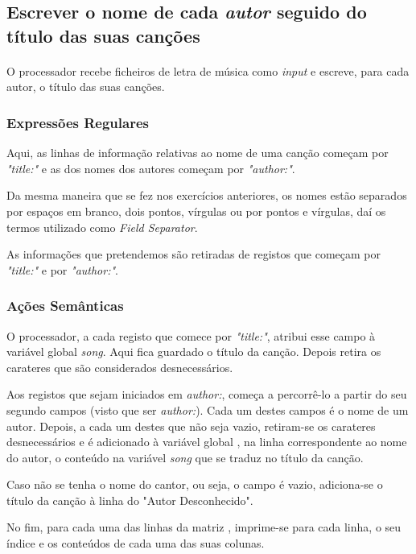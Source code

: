 \documentclass{article}
\begin{document}
\subsection{Escrever o nome de cada \emph{autor} seguido do título das suas canções}

\paragraph{} O processador recebe ficheiros de letra de música como \emph{input} e escreve, para cada autor, o título das suas canções.

\subsubsection{Expressões Regulares}

Aqui, as linhas de informação relativas ao nome de uma canção começam por   \emph{"title:"} e as dos nomes dos autores começam por \emph{"author:"}.

Da mesma maneira que se fez nos exercícios anteriores, os nomes estão separados por espaços em branco, dois pontos, vírgulas ou por pontos e vírgulas, daí os termos utilizado como \emph{Field Separator}.

As informações que pretendemos são retiradas de registos que começam por \emph{"title:"} e por \emph{"author:"}.

\subsubsection{Ações Semânticas}

O processador, a cada registo que comece por \emph{"title:"}, atribui esse campo à variável global \emph{song}. Aqui fica guardado o título da canção. Depois retira os carateres que são considerados desnecessários.

Aos registos que sejam iniciados em \emph{author:}, começa a percorrê-lo a partir do seu segundo campos (visto que ser \emph{author:}). Cada um destes campos é o nome de um autor. Depois, a cada um destes que não seja vazio, retiram-se os carateres desnecessários e é adicionado à variável global , na linha correspondente ao nome do autor, o  conteúdo na variável \emph{song} que se traduz no título da canção.

Caso não se tenha o nome do cantor, ou seja, o campo é vazio, adiciona-se o título da canção à linha do "Autor Desconhecido".

No fim, para cada uma das linhas da matriz , imprime-se para cada linha, o seu índice e os conteúdos de cada uma das suas colunas.
\end{document}
